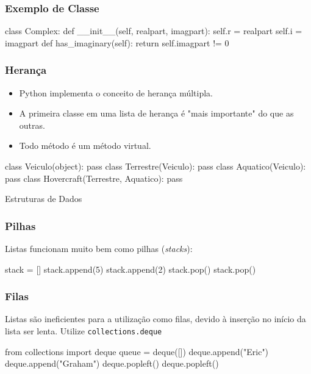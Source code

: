 \begin{frame}[fragile]
    \frametitle{Exemplo de Classe}
    \begin{python}
        class Complex:
            def __init__(self, realpart, imagpart):
                self.r = realpart
                self.i = imagpart
            def has_imaginary(self):
                return self.imagpart != 0
    \end{python}
\end{frame}

\begin{frame}[fragile]
    \frametitle{Herança}
    \begin{itemize}
        \item Python implementa o conceito de herança múltipla.
        \item A primeira classe em uma lista de herança é "mais
        importante" do que as outras.
        \item Todo método é um método virtual.
    \end{itemize}
    \begin{python}
        class Veiculo(object):
            pass
        class Terrestre(Veiculo):
            pass
        class Aquatico(Veiculo):
            pass
        class Hovercraft(Terrestre, Aquatico):
            pass
    \end{python}
\end{frame}

\begin{frame}
    \begin{center}
        \Huge Estruturas de Dados
    \end{center}
\end{frame}

\begin{frame}[fragile]
    \frametitle{Pilhas}
    Listas funcionam muito bem como pilhas (\textit{stacks}):
    \begin{python}
        stack = []
        stack.append(5)
        stack.append(2)
        stack.pop()
        stack.pop()
    \end{python}
\end{frame}

\begin{frame}[fragile]
    \frametitle{Filas}
    Listas são ineficientes para a utilização como filas, devido à
    inserção no início da lista ser lenta. Utilize
    \texttt{\color{green}collections.deque}
    \begin{python}
        from collections import deque
        queue = deque([])
        deque.append("Eric")
        deque.append("Graham")
        deque.popleft()
        deque.popleft()
    \end{python}
\end{frame}

